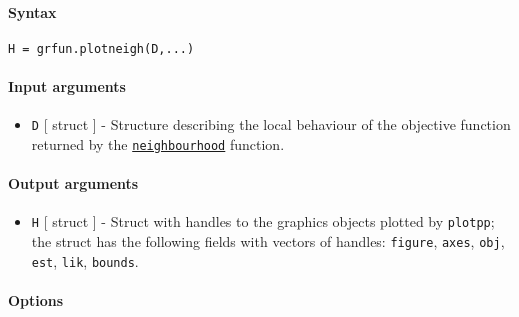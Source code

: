 


	\paragraph{Syntax}

\begin{verbatim}
H = grfun.plotneigh(D,...)
\end{verbatim}

\paragraph{Input arguments}

\begin{itemize}
\itemsep1pt\parskip0pt
\item
  \texttt{D} {[} struct {]} - Structure describing the local behaviour
  of the objective function returned by the
  \href{model/neighbourhood}{\texttt{neighbourhood}} function.
\end{itemize}

\paragraph{Output arguments}

\begin{itemize}
\itemsep1pt\parskip0pt
\item
  \texttt{H} {[} struct {]} - Struct with handles to the graphics
  objects plotted by \texttt{plotpp}; the struct has the following
  fields with vectors of handles: \texttt{figure}, \texttt{axes},
  \texttt{obj}, \texttt{est}, \texttt{lik}, \texttt{bounds}.
\end{itemize}

\paragraph{Options}

